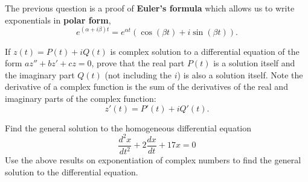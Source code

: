 \clearpage


The previous question is a proof of \textbf{Euler's formula} which allows us to write exponentials in \textbf{polar form},
\[ e^{(\alpha + i \beta) t} = e^{\alpha t} \left( \cos{(\beta t)} + i  \sin{(\beta t)} \right) .\]

\bs

\bb[resume]
\ii If $z(t)=P(t)+i Q(t)$ is complex solution to a differential equation of the form $az''+bz'+cz=0$,
prove that the real part $P(t)$ is a solution itself and the imaginary part $Q(t)$ (not including the $i$) is also a solution itself.
Note the derivative of a complex function is the sum of the derivatives of the real and imaginary parts of the complex function:
\[ z'(t) = P'(t) + i Q'(t) .\] \vfill

\clearpage



 

\item Find the general solution to the homogeneous differential equation \label{13problem14} 
\[
\frac{d^2x}{dt^2}+2 \frac{dx}{dt} + 17x=0
\]
Use the above results on exponentiation of complex numbers to find the general solution to the differential equation. \vfill
\ee


